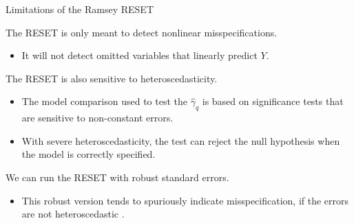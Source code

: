 \documentclass{beamer}\usepackage[]{graphicx}\usepackage[]{color}
\begin{document}
\watermarkon %

\begin{frame}{Limitations of the Ramsey RESET}
  
  The RESET is only meant to detect nonlinear misspecifications.
  \begin{itemize}
  \item It will not detect omitted variables that linearly predict $Y$.
  \end{itemize}
  \va
  The RESET is also sensitive to heteroscedasticity.
  \begin{itemize}
  \item The model comparison used to test the $\hat{\gamma}_q$ is based on 
    significance tests that are sensitive to non-constant errors.
    \vc
  \item With severe heteroscedasticity, the test can reject the null hypothesis 
    when the model is correctly specified.
  \end{itemize}
  \va
  We can run the RESET with robust standard errors.
  \begin{itemize}
  \item This robust version tends to spuriously indicate misspecification, if 
    the errors are not heteroscedastic \citep{longTrivedi:1993}.
  \end{itemize}
  
\end{frame}

\end{document}
